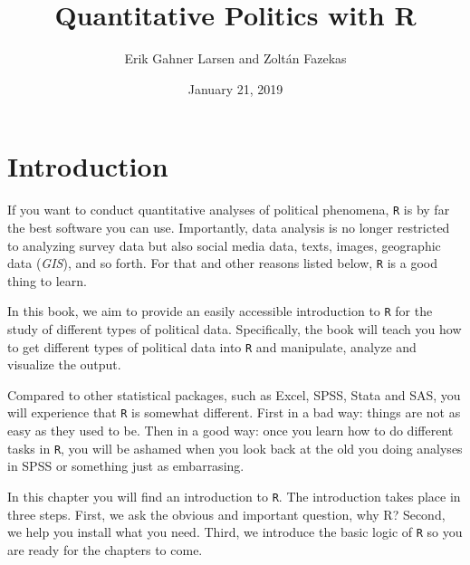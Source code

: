 \documentclass[12pt,oneside]{reedthesis}
\title{\Huge{ Quantitative Politics with R } \vspace{2em}}
\author{Erik Gahner Larsen and Zoltán Fazekas}
\date{January 21, 2019}
\theoremstyle{definition}
\theoremstyle{definition}
\theoremstyle{definition}
\theoremstyle{remark}
\begin{document}
      \maketitle
  
  \frontmatter %
  \pagestyle{empty} %

  
  
      \hypersetup{linkcolor=black}
    \setcounter{tocdepth}{2}
    \tableofcontents
  
  
  
  
  
  \mainmatter %
  \pagestyle{fancyplain} %

  \chapter{Introduction}\label{introduction}
  
  If you want to conduct quantitative analyses of political phenomena,
  \texttt{R} is by far the best software you can use. Importantly, data
  analysis is no longer restricted to analyzing survey data but also
  social media data, texts, images, geographic data (\emph{GIS}), and so
  forth. For that and other reasons listed below, \texttt{R} is a good
  thing to learn.
  
  In this book, we aim to provide an easily accessible introduction to
  \texttt{R} for the study of different types of political data.
  Specifically, the book will teach you how to get different types of
  political data into \texttt{R} and manipulate, analyze and visualize the
  output.
  
  Compared to other statistical packages, such as Excel, SPSS, Stata and
  SAS, you will experience that \texttt{R} is somewhat different. First in
  a bad way: things are not as easy as they used to be. Then in a good
  way: once you learn how to do different tasks in \texttt{R}, you will be
  ashamed when you look back at the old you doing analyses in SPSS or
  something just as embarrasing.
  
  In this chapter you will find an introduction to \texttt{R}. The
  introduction takes place in three steps. First, we ask the obvious and
  important question, why R? Second, we help you install what you need.
  Third, we introduce the basic logic of \texttt{R} so you are ready for
  the chapters to come.
  
\end{document}
